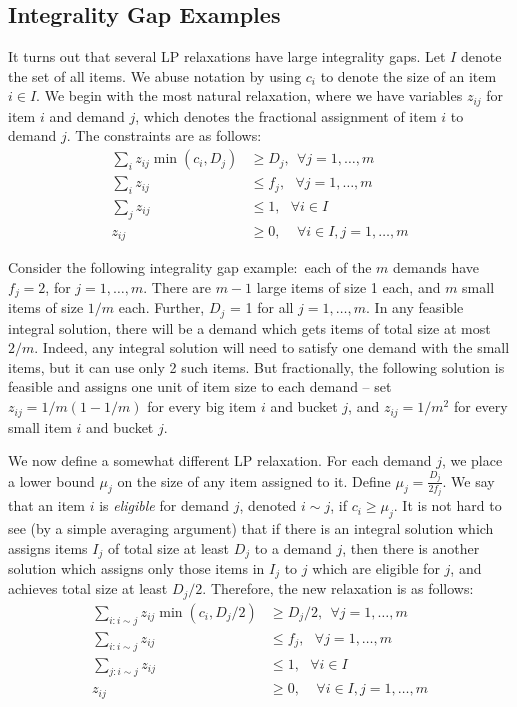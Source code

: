 \subsection{Integrality Gap Examples}
It turns out that several LP relaxations have large integrality gaps. Let $I$ denote the set of all items. We abuse notation by using $c_i$ to denote the 
size of an item $i \in I$. We begin with the most natural relaxation, where we have variables $z_{ij}$ for item $i$ and demand $j$, which denotes the fractional assignment of item $i$ to demand $j$. The constraints are as follows:
\begin{align*}
\sum_{i} z_{ij} \min(c_i, D_j) & \geq D_j, \ \  \forall j=1, \ldots, m \\
\sum_i z_{ij} & \leq f_j, \ \ \ \forall j = 1, \ldots, m \\
\sum_j z_{ij} & \leq 1,  \ \ \ \forall i \in I \\
z_{ij} & \geq 0, \ \ \ \ \ \forall i \in I, j = 1, \ldots, m
\end{align*}

Consider the following integrality gap example:~each of the $m$ demands have $f_j = 2$, for $j=1, \ldots, m$. There are $m-1$ large items of size 1 each,
 and $m$ small items of size $1/m$ each. Further, $D_j$ = 1 for all $j=1, \ldots, m$. 
 In any feasible integral solution, there will be a demand which gets items of total size at most $2/m$. Indeed, any integral solution will need to satisfy one demand with the small items, but it can use only 2 such items. But fractionally, the following solution is feasible and assigns one unit of item size to each demand -- set $z_{ij} = 1/m (1-1/m)$ for every big item $i$ and bucket $j$, and
$z_{ij} = 1/m^2$ for every small item $i$ and bucket $j$.

We now define a somewhat different LP relaxation. For each  demand $j$, we place a lower bound $\mu_j$ on the size of any item assigned to it. Define $\mu_j = \frac{D_j}{2 f_j}$. We say that an item $i$ is {\em eligible} for demand $j$, denoted $i \sim j$,  if $c_i \geq \mu_j$. It is not hard to see (by a simple averaging argument) that if there is an integral solution which assigns items $I_j$ of total size at least $D_j$ to a demand $j$, then there is another solution which assigns only those items in $I_j$ to $j$ which are eligible for $j$, and achieves total size at least $D_j/2$. Therefore, the new relaxation is as follows:
\begin{align*}
\sum_{i: i \sim j} z_{ij} \min(c_i, D_j/2) & \geq D_j/2, \ \  \forall j=1, \ldots, m \\
\sum_{i: i \sim j} z_{ij} & \leq f_j, \ \ \ \forall j = 1, \ldots, m \\
\sum_{j: i \sim j} z_{ij} & \leq 1,  \ \ \ \forall i \in I\\
z_{ij} & \geq 0, \ \ \ \ \ \forall i \in I,j=1, \ldots, m
\end{align*}


